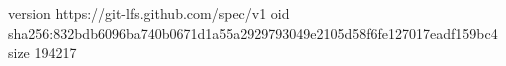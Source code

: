 version https://git-lfs.github.com/spec/v1
oid sha256:832bdb6096ba740b0671d1a55a2929793049e2105d58f6fe127017eadf159bc4
size 194217
